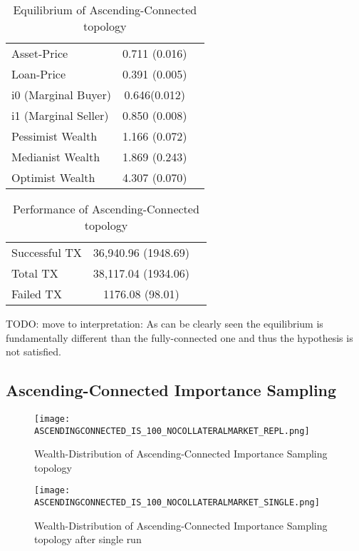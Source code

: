 \documentclass[Bachelorarbeit.tex]{subfiles}
\begin{document}
\begin{table}[h]
	\caption{Equilibrium of Ascending-Connected topology}
	\centering
	\begin{tabular} { l c r }
		\hline
		Asset-Price & 0.711 (0.016) \\
		Loan-Price & 0.391 (0.005) \\
		i0 (Marginal Buyer) & 0.646(0.012) \\
		i1 (Marginal Seller) & 0.850 (0.008) \\
		Pessimist Wealth & 1.166 (0.072) \\
		Medianist Wealth & 1.869 (0.243) \\
		Optimist Wealth & 4.307 (0.070) \\
		\hline
	\end{tabular}
\end{table} 

\begin{table}[h]
	\caption{Performance of Ascending-Connected topology}
	\centering
	\begin{tabular} { l c r }
		\hline
		Successful TX & 36,940.96 (1948.69) \\
		Total TX & 38,117.04 (1934.06) \\
		Failed TX & 1176.08 (98.01) \\
		\hline
	\end{tabular}
\end{table}

TODO: move to interpretation: As can be clearly seen the equilibrium is fundamentally different than the fully-connected one and thus the hypothesis is not satisfied.

\subsection{Ascending-Connected Importance Sampling}
\begin{figure}[H]
	\centering
  \texttt{[image: ASCENDINGCONNECTED\_IS\_100\_NOCOLLATERALMARKET\_REPL.png]}
	\caption{Wealth-Distribution of Ascending-Connected Importance Sampling topology}
	\label{fig1}
\end{figure}

\begin{figure}[H]
	\centering
  \texttt{[image: ASCENDINGCONNECTED\_IS\_100\_NOCOLLATERALMARKET\_SINGLE.png]}
	\caption{Wealth-Distribution of Ascending-Connected Importance Sampling topology after single run}
	\label{fig1}
\end{figure}
\end{document}

